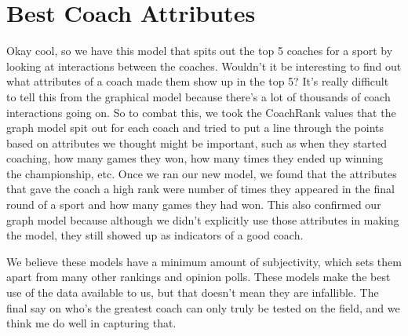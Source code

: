 \documentclass[12pt]{article}
\begin{document}
\section{Best Coach Attributes}
Okay cool, so we have this model that spits out the top 5 coaches for a sport by looking at interactions between the coaches. Wouldn't it be interesting to find out what attributes of a coach made them show up in the top 5? It's really difficult to tell this from the graphical model because there's a lot of thousands of coach interactions going on. So to combat this, we took the CoachRank values that the graph model spit out for each coach and tried to put a line through the points based on attributes we thought might be important, such as when they started coaching, how many games they won, how many times they ended up winning the championship, etc. Once we ran our new model, we found that the attributes that gave the coach a high rank were number of times they appeared in the final round of a sport and how many games they had won. This also confirmed our graph model because although we didn't explicitly use those attributes in making the model, they still showed up as indicators of a good coach. 

We believe these models have a minimum amount of subjectivity, which sets them apart from many other rankings and opinion polls. These models make the best use of the data available to us, but that doesn't mean they are infallible. The final say on who's the greatest coach can only truly be tested on the field, and we think me do well in capturing that.
\end{document}
